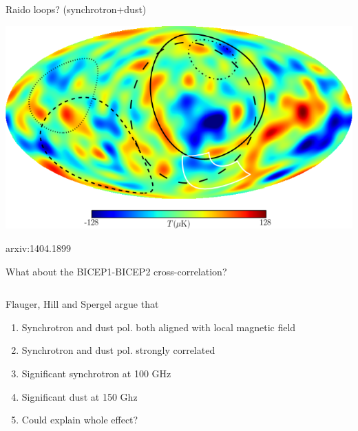\documentclass{beamer}
\begin{document}
\begin{frame}{Raido loops? (synchrotron+dust)}
	\begin{center}
		\includegraphics[width=\textwidth]{radioloops.png}

		{\footnotesize arxiv:1404.1899}

	\end{center}
\end{frame}

\begin{frame}{What about the BICEP1-BICEP2 cross-correlation?}
	\begin{columns}
		\begin{column}{6cm}
			Flauger, Hill and Spergel argue that
			\begin{enumerate}
				\item<2-> Synchrotron and dust pol. both aligned with local magnetic field
				\item<3-> Synchrotron and dust pol. strongly correlated
				\item<4-> Significant synchrotron at 100 GHz
				\item<5-> Significant dust at 150 Ghz
				\item<6-> Could explain whole effect?
			\end{enumerate}
		\end{column}
		\begin{column}{6cm}
			\begin{center}
			\end{center}
		\end{column}
	\end{columns}
\end{frame}
\end{document}
